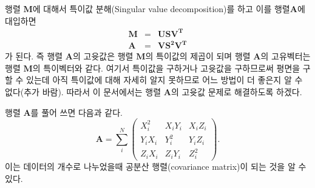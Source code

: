 \documentclass[a4paper,14pt]{oblivoir}
\begin{document}
행렬 $\mathbf{M}$에 대해서 특이값 분해(Singular value decomposition)를 하고 이를 행렬$\mathbf{A}$에
대입하면
\begin{eqnarray}
\mathbf{M}&=&\mathbf{U}\mathbf{S}\mathbf{V^T} \\
\mathbf{A}&=&\mathbf{V}\mathbf{S^2}\mathbf{V^T}
\end{eqnarray}
가 된다. 즉 행렬 $\mathbf{A}$의 고윳값은 행렬 $\mathbf{M}$의 특이값의 제곱이 되며 
행렬 $\mathbf{A}$의 고유벡터는 행렬 $\mathbf{M}$의 특이벡터와 같다.
여기서 특이값을 구하거나 고윳값을 구하므로써 평면을 구할 수 있는데 아직 특이값에 대해 자세히 알지 못하므로
어느 방법이 더 좋은지 알 수 없다(추가 바람).
따라서 이 문서에서는 행렬 $\mathbf{A}$의 고윳값 문제로 해결하도록 하겠다.

행렬 $\mathbf{A}$를 풀어 쓰면 다음과 같다.
\begin{equation} \label{matrix_A}
\mathbf{A} = \sum_i^N\left( \begin{array}{ccc}
  X_i^2 & X_iY_i & X_iZ_i \\
  Y_iX_i & Y_i^2 & Y_iZ_i \\
  Z_iX_i & Z_iY_i & Z_i^2
\end{array} \right).
\end{equation}
이는 데이터의 개수로 나누었을때 공분산 행렬(covariance matrix)이 되는 것을 알 수 있다.
\end{document}
